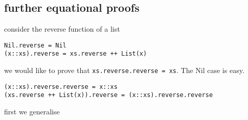 \subsection{ further equational proofs}

consider the reverse function of a list

\begin{lstlisting}
Nil.reverse = Nil
(x::xs).reverse = xs.reverse ++ List(x)
\end{lstlisting}

we would like to prove that \lstinline|xs.reverse.reverse = xs|. The Nil case is easy. 
\begin{lstlisting}
(x::xs).reverse.reverse = x::xs
(xs.reverse ++ List(x)).reverse = (x::xs).reverse.reverse
\end{lstlisting}

first we generalise










